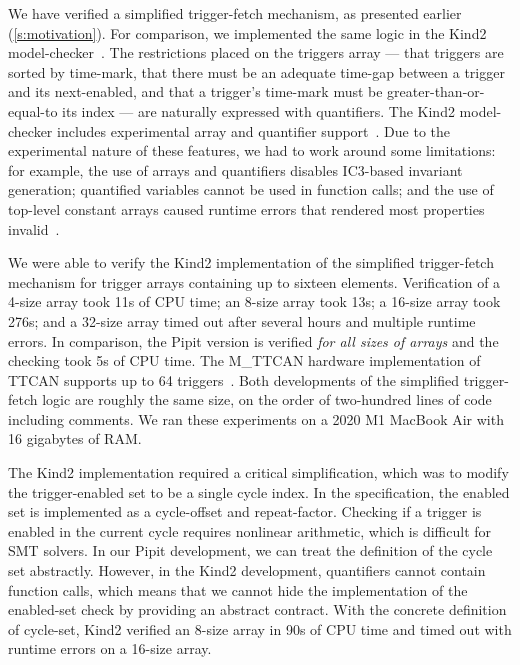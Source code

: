 We have verified a simplified trigger-fetch mechanism, as presented earlier (\autoref{s:motivation}).
For comparison, we implemented the same logic in the Kind2 model-checker~\cite{champion2016kind2}.
The restrictions placed on the triggers array --- that triggers are sorted by time-mark, that there must be an adequate time-gap between a trigger and its next-enabled, and that a trigger's time-mark must be greater-than-or-equal-to its index --- are naturally expressed with quantifiers.
The Kind2 model-checker includes experimental array and quantifier support~\cite{kind2userdoc}.
Due to the experimental nature of these features, we had to work around some limitations: for example, the use of arrays and quantifiers disables IC3-based invariant generation; quantified variables cannot be used in function calls; and the use of top-level constant arrays caused runtime errors that rendered most properties invalid~\cite{kind2024toparray}.

We were able to verify the Kind2 implementation of the simplified trigger-fetch mechanism for trigger arrays containing up to sixteen elements.
Verification of a 4-size array took 11s of CPU time; an 8-size array took 13s; a 16-size array took 276s; and a 32-size array timed out after several hours and multiple runtime errors.
In comparison, the Pipit version is verified \emph{for all sizes of arrays} and the checking took 5s of CPU time.
The M_TTCAN hardware implementation of TTCAN supports up to 64 triggers~\cite{bosch2019mttcan}.
Both developments of the simplified trigger-fetch logic are roughly the same size, on the order of two-hundred lines of code including comments.
We ran these experiments on a 2020 M1 MacBook Air with 16 gigabytes of RAM.

The Kind2 implementation required a critical simplification, which was to modify the trigger-enabled set to be a single cycle index.
In the specification, the enabled set is implemented as a cycle-offset and repeat-factor.
Checking if a trigger is enabled in the current cycle requires nonlinear arithmetic, which is difficult for SMT solvers.
In our Pipit development, we can treat the definition of the cycle set abstractly.
However, in the Kind2 development, quantifiers cannot contain function calls, which means that we cannot hide the implementation of the enabled-set check by providing an abstract contract.
With the concrete definition of cycle-set, Kind2 verified an 8-size array in 90s of CPU time and timed out with runtime errors on a 16-size array.

